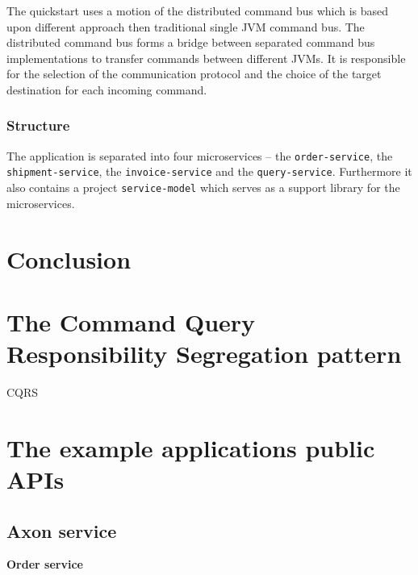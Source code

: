 \documentclass[oneside,
  digital, %
  table,   %
  nolof,     %
  nolot,     %
]{fithesis3}
\begin{document}
The quickstart uses a motion of the distributed command bus which is based upon different approach then traditional single JVM command bus. The distributed command bus forms a bridge between separated command bus implementations to transfer commands between different JVMs. It is responsible for the selection of the communication protocol and the choice of the target destination for each incoming command.

\subsection{Structure}

The application is separated into four microservices -- the \newline \texttt{order-service}, the \texttt{shipment-service}, the \texttt{invoice-service} and the \texttt{query-service}. Furthermore it also contains a project \texttt{service-model} which serves as a support library for the microservices.



\clearpage
\chapter{Conclusion}



\makeatletter\thesis@blocks@clear\makeatother
{} %
\printindex




\appendix %

\chapter{The Command Query Responsibility Segregation pattern}

CQRS

\chapter{The example applications public APIs}

\section{Axon service}

\textbf{Order service}
\end{document}
